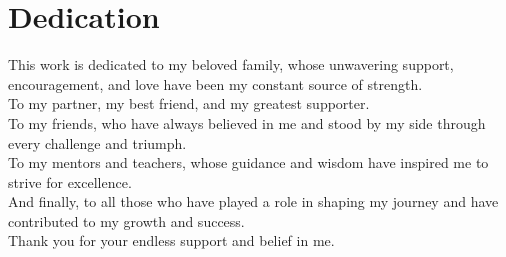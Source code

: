 \chapter*{Dedication}

This work is dedicated to my beloved family, whose unwavering support,
encouragement, and love have been my constant source of strength.\\

To my partner, my best friend, and my greatest supporter.\\

To my friends, who have always believed in me and stood by my side through every challenge and triumph.\\

To my mentors and teachers, whose guidance and wisdom have inspired me to strive for excellence.\\

And finally, to all those who have played a role in shaping my journey and have contributed to my growth and success.\\

Thank you for your endless support and belief in me.